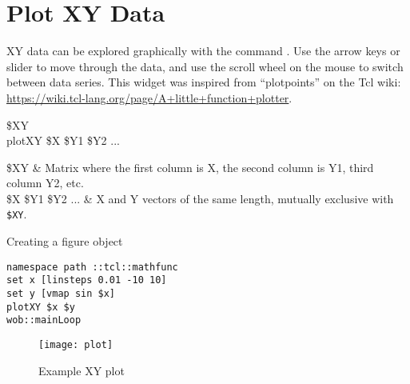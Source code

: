 \section{Plot XY Data}
XY data can be explored graphically with the command . Use the arrow keys or slider to move through the data, and use the scroll wheel on the mouse to switch between data series.
This widget was inspired from ``plotpoints'' on the Tcl wiki: \url{https://wiki.tcl-lang.org/page/A+little+function+plotter}.
\begin{syntax}
 \$XY \\
plotXY \$X \$Y1 \$Y2 ...
\end{syntax}
\begin{args}
\$XY & Matrix where the first column is X, the second column is Y1, third column Y2, etc. \\
\$X \$Y1 \$Y2 ... & X and Y vectors of the same length, mutually exclusive with \texttt{\$XY}. 
\end{args}
\begin{example}{Creating a figure object}
\begin{lstlisting}
namespace path ::tcl::mathfunc
set x [linsteps 0.01 -10 10]
set y [vmap sin $x]
plotXY $x $y
wob::mainLoop
\end{lstlisting}
\end{example}
\begin{figure}[!htb]
\centering
\texttt{[image: plot]}
\caption{Example XY plot}
\label{fig:plot}
\end{figure}

